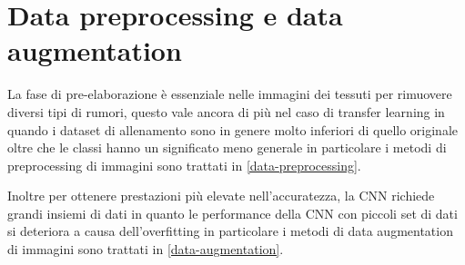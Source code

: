 \section{Data preprocessing e data augmentation}\label{data-pre-processing-e-augmentation-processing}

La fase di pre-elaborazione è essenziale nelle immagini dei tessuti per rimuovere diversi tipi di rumori, questo vale ancora di più nel caso di transfer learning in quando i dataset di allenamento sono in genere molto inferiori di quello originale oltre che le classi hanno un significato meno generale\cite{joel_tl} in particolare i metodi di preprocessing di immagini sono trattati in \cref{data-preprocessing}.

Inoltre per ottenere prestazioni più elevate nell'accuratezza, la CNN richiede grandi insiemi di dati in quanto le performance della CNN con piccoli set di dati si deteriora  a causa dell'\gls{overfitting}\cite{joel_tl} in particolare i metodi di data augmentation di immagini sono trattati in \cref{data-augmentation}.





